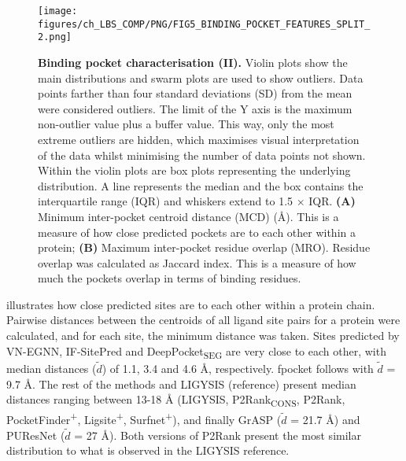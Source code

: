 \begin{figure}[ht!]
    \centering
    \texttt{[image: figures/ch\_LBS\_COMP/PNG/FIG5\_BINDING\_POCKET\_FEATURES\_SPLIT\_2.png]}
    \caption[Binding pocket characterisation (II)]{\textbf{Binding pocket characterisation (II).} Violin plots show the main distributions and swarm plots are used to show outliers. Data points farther than four standard deviations (SD) from the mean were considered outliers. The limit of the Y axis is the maximum non-outlier value plus a buffer value. This way, only the most extreme outliers are hidden, which maximises visual interpretation of the data whilst minimising the number of data points not shown. Within the violin plots are box plots representing the underlying distribution. A line represents the median and the box contains the interquartile range (IQR) and whiskers extend to 1.5 $\times$ IQR. \textbf{(A)} Minimum inter-pocket centroid distance (MCD) (\AA{}). This is a measure of how close predicted pockets are to each other within a protein; \textbf{(B)} Maximum inter-pocket residue overlap (MRO). Residue overlap was calculated as Jaccard index. This is a measure of how much the pockets overlap in terms of binding residues.}
    \label{fig:pocket_features_2}
\end{figure}

 illustrates how close predicted sites are to each other within a protein chain. Pairwise distances between the centroids of all ligand site pairs for a protein were calculated, and for each site, the minimum distance was taken. Sites predicted by VN-EGNN, IF-SitePred and DeepPocket\textsubscript{SEG} are very close to each other, with median distances ($\tilde{\textit{d}}$) of 1.1, 3.4 and 4.6 \AA{}, respectively. fpocket follows with $\tilde{\textit{d}}$ = 9.7 \AA{}. The rest of the methods and LIGYSIS (reference) present median distances ranging between 13-18 \AA{} (LIGYSIS, P2Rank\textsubscript{CONS}, P2Rank, PocketFinder\textsuperscript{+}, Ligsite\textsuperscript{+}, Surfnet\textsuperscript{+}), and finally GrASP ($\tilde{\textit{d}}$ = 21.7 \AA{}) and PUResNet ($\tilde{\textit{d}}$ = 27 \AA{}). Both versions of P2Rank present the most similar distribution to what is observed in the LIGYSIS reference.

